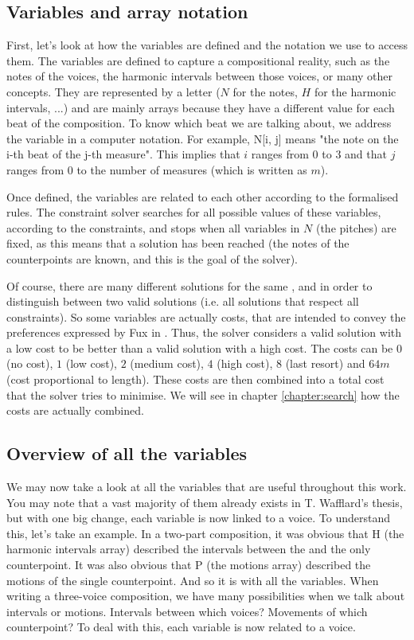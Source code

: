 \subsection{Variables and array notation} \label{Wafflard-variables}
First, let's look at how the variables are defined and the notation we use to access them. The variables are defined to capture a compositional reality, such as the notes of the voices, the harmonic intervals between those voices, or many other concepts. They are represented by a letter ($N$ for the notes, $H$ for the harmonic intervals, ...) and are mainly arrays because they have a different value for each beat of the composition. To know which beat we are talking about, we address the variable in a computer notation. For example, N[i, j] means "the note on the i-th beat of the j-th measure". This implies that $i$ ranges from $0$ to $3$ and that $j$ ranges from $0$ to the number of measures (which is written as $m$).

Once defined, the variables are related to each other according to the formalised rules. The constraint solver searches for all possible values of these variables, according to the constraints, and stops when all variables in $N$ (the pitches) are fixed, as this means that a solution has been reached (the notes of the counterpoints are known, and this is the goal of the solver).

Of course, there are many different solutions for the same \cf, and in order to distinguish between two valid solutions (i.e. all solutions that respect all constraints). So some variables are actually costs, that are intended to convey the preferences expressed by Fux in \gap. Thus, the solver considers a valid solution with a low cost to be better than a valid solution with a high cost. The costs can be $0$ (no cost), $1$ (low cost), $2$ (medium cost), $4$ (high cost), $8$ (last resort) and $64m$ (cost proportional to length). These costs are then combined into a total cost that the solver tries to minimise. We will see in chapter \ref{chapter:search} how the costs are actually combined.


\subsection{Overview of all the variables}
We may now take a look at all the variables that are useful throughout this work. You may note that a vast majority of them already exists in T. Wafflard's thesis, but with one big change, each variable is now linked to a voice. To understand this, let's take an example. In a two-part composition, it was obvious that H (the harmonic intervals array) described the intervals between the \cfs and the only counterpoint. It was also obvious that P (the motions array) described the motions of the single counterpoint. And so it is with all the variables. When writing a three-voice composition, we have many possibilities when we talk about intervals or motions. Intervals between which voices? Movements of which counterpoint? To deal with this, each variable is now related to a voice.

